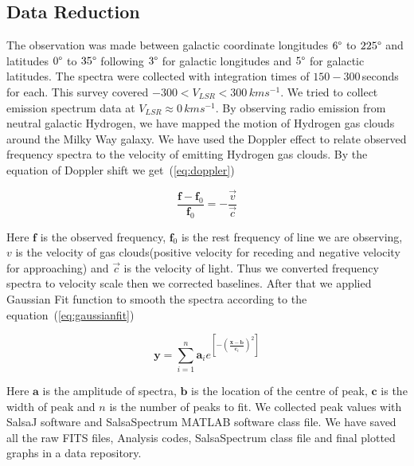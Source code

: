 \documentclass[conference]{IEEEtran}
\begin{document}
\subsection{Data Reduction}

The observation was made between galactic coordinate longitudes $6\degree$ to $225\degree$ and latitudes $0\degree$ to $35\degree$ following $3\degree$ for galactic longitudes and $5\degree$ for galactic latitudes. The spectra were collected with integration times of $150-300$\,seconds for each. This survey covered $-300<\mathit{V}_{LSR}<300$\,$kms^{-1}$. We tried to collect emission spectrum data at $\mathit{V}_{LSR}\approx 0$\,$kms^{-1}$. By observing radio emission from neutral galactic Hydrogen, we have mapped the motion of Hydrogen gas clouds around the Milky Way galaxy. We have used the Doppler effect to relate observed frequency spectra to the velocity of emitting Hydrogen gas clouds. By the equation of Doppler shift\cite{CathyHorellou2015} we get~(\ref{eq:doppler})

\begin{equation}
 \frac{\mathbf{f}-\mathbf{f}_{0}}{\mathbf{f}_{0}}=-\frac{\vec{v}}{\vec{c}}
 \label{eq:doppler}
\end{equation}

Here $\mathbf{f}$ is the observed frequency, $\mathbf{f}_{0}$ is the rest frequency of line we are observing, $\mathbf{\mathit{v}}$ is the velocity of gas clouds(positive velocity for receding and negative velocity for approaching) and $\vec{c}$ is the velocity of light. Thus we converted frequency spectra to velocity scale then we corrected baselines. After that we applied Gaussian Fit function to smooth the spectra according to the equation~(\ref{eq:gaussianfit})

\begin{equation}
  \mathbf{y}=\sum^n_{i=1}\mathbf{a}_{i}e^{\left[-\left(\frac{\mathbf{x}-\mathbf{b}}{\mathbf{c}_{i}} \right)^{2}\right]}
  \label{eq:gaussianfit}
\end{equation}

Here $\mathbf{a}$ is the amplitude of spectra, $\mathbf{b}$ is the location of the centre of peak, $\mathbf{c}$ is the width of peak and $n$ is the number of peaks to fit\cite{CathyHorellou2015}. We collected peak values with SalsaJ software and SalsaSpectrum\cite{DanielDahlin2015} MATLAB software class file. We have saved all the raw FITS files, Analysis codes, SalsaSpectrum class file and final plotted graphs in a data repository\cite{Hossain2018}.
\end{document}
